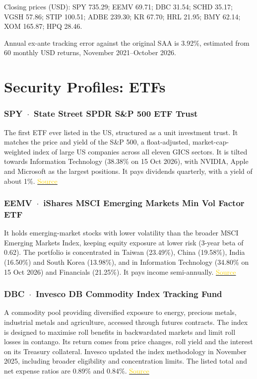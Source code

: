 \documentclass[10pt,a4paper]{article}
\begin{document}
Closing prices (USD): SPY 735.29; EEMV 69.71; DBC 31.54; SCHD 35.17; VGSH 57.86; STIP 100.51; ADBE 239.30; KR 67.70; HRL 21.95; BMY 62.14; XOM 165.87; HPQ 28.46.


Annual ex-ante tracking error against the original SAA is 3.92\%, estimated from 60 monthly USD returns, November 2021--October 2026.
\clearpage
\begingroup
\section*{Security Profiles: ETFs}
\subsubsection*{SPY \,$\cdot$\, State Street SPDR S\&P 500 ETF Trust}
The first ETF ever listed in the US, structured as a unit investment trust. It matches the price and yield of the
S\&P 500, a float-adjusted, market-cap-weighted index of large US companies across all eleven GICS sectors.
It is tilted towards Information Technology (38.38\% on 15 Oct 2026), with NVIDIA, Apple and Microsoft as the largest
positions. It pays dividends quarterly, with a yield of about 1\%.
\href{https://www.ssga.com/us/en/intermediary/etfs/state-street-spdr-sp-500-etf-trust-spy}{\textcolor{gold}{Source}}

\subsubsection*{EEMV \,$\cdot$\, iShares MSCI Emerging Markets Min Vol Factor ETF}
It holds emerging-market stocks with lower volatility than the broader MSCI Emerging Markets Index, keeping
equity exposure at lower risk (3-year beta of 0.62). The portfolio is concentrated in Taiwan (23.49\%),
China (19.58\%), India (16.50\%) and South Korea (13.98\%), and in Information Technology
(34.80\% on 15 Oct 2026) and Financials (21.25\%). It pays income semi-annually.
\href{https://www.ishares.com/us/products/239641/ishares-msci-emerging-markets-minimum-volatility-etf}{\textcolor{gold}{Source}}

\subsubsection*{DBC \,$\cdot$\, Invesco DB Commodity Index Tracking Fund}
A commodity pool providing diversified exposure to energy, precious metals, industrial metals and agriculture,
accessed through futures contracts. The index is designed to maximise roll benefits in
backwardated markets and limit roll losses in contango. Its return comes from price changes, roll yield and
the interest on its Treasury collateral. Invesco updated the index methodology in November 2025, including broader eligibility and concentration limits. The listed total and net expense ratios are 0.89\% and 0.84\%.
\href{https://www.invesco.com/content/dam/invesco/us/en/product-documents/etf/fact-sheet/dbc-invesco-db-commodity-index-tracking-fund-fact-sheet.pdf}{\textcolor{gold}{Source}}
\end{document}
